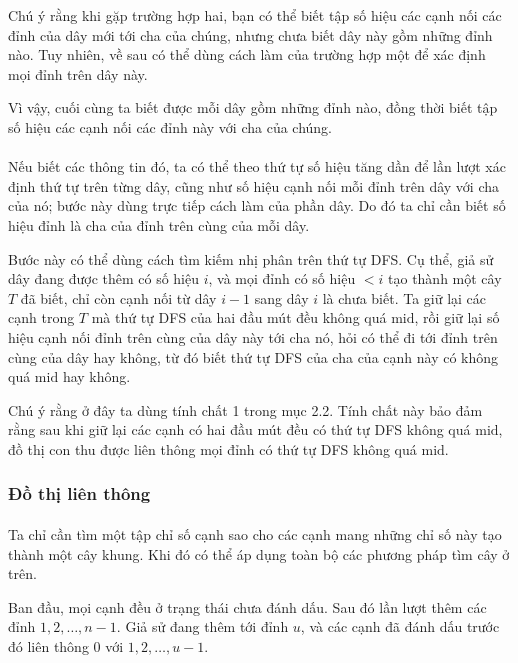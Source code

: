 \documentclass[11pt]{article}
\begin{document}
Chú ý rằng khi gặp trường hợp hai, bạn có thể biết tập số hiệu các cạnh nối các
đỉnh của dây mới tới cha của chúng, nhưng chưa biết dây này gồm những đỉnh nào.
Tuy nhiên, về sau có thể dùng cách làm của trường hợp một để xác định mọi đỉnh
trên dây này.

Vì vậy, cuối cùng ta biết được mỗi dây gồm những đỉnh nào, đồng thời biết tập số
hiệu các cạnh nối các đỉnh này với cha của chúng.

\paragraph{}
Nếu biết các thông tin đó, ta có thể theo thứ tự số hiệu tăng dần để lần lượt
xác định thứ tự trên từng dây, cũng như số hiệu cạnh nối mỗi đỉnh trên dây với
cha của nó; bước này dùng trực tiếp cách làm của phần dây. Do đó ta chỉ cần biết
số hiệu đỉnh là cha của đỉnh trên cùng của mỗi dây.

Bước này có thể dùng cách tìm kiếm nhị phân trên thứ tự DFS. Cụ thể, giả sử dây
đang được thêm có số hiệu \(i\), và mọi đỉnh có số hiệu \(<i\) tạo thành một
cây \(T\) đã biết, chỉ còn cạnh nối từ dây \(i-1\) sang dây \(i\) là chưa biết.
Ta giữ lại các cạnh trong \(T\) mà thứ tự DFS của hai đầu mút đều không quá
\(\mathrm{mid}\), rồi giữ lại số hiệu cạnh nối đỉnh trên cùng của dây này tới
cha nó, hỏi có thể đi tới đỉnh trên cùng của dây hay không, từ đó biết thứ tự
DFS của cha của cạnh này có không quá \(\mathrm{mid}\) hay không.

Chú ý rằng ở đây ta dùng tính chất 1 trong mục 2.2. Tính chất này bảo đảm rằng
sau khi giữ lại các cạnh có hai đầu mút đều có thứ tự DFS không quá
\(\mathrm{mid}\), đồ thị con thu được liên thông mọi đỉnh có thứ tự DFS không
quá \(\mathrm{mid}\).

\subsubsection{Đồ thị liên thông}

\paragraph{}
Ta chỉ cần tìm một tập chỉ số cạnh sao cho các cạnh mang những chỉ số này tạo
thành một cây khung. Khi đó có thể áp dụng toàn bộ các phương pháp tìm cây ở
trên.

Ban đầu, mọi cạnh đều ở trạng thái chưa đánh dấu. Sau đó lần lượt thêm các đỉnh
\(1,2,\ldots,n-1\). Giả sử đang thêm tới đỉnh \(u\), và các cạnh đã đánh dấu
trước đó liên thông \(0\) với \(1,2,\ldots,u-1\).
\end{document}
